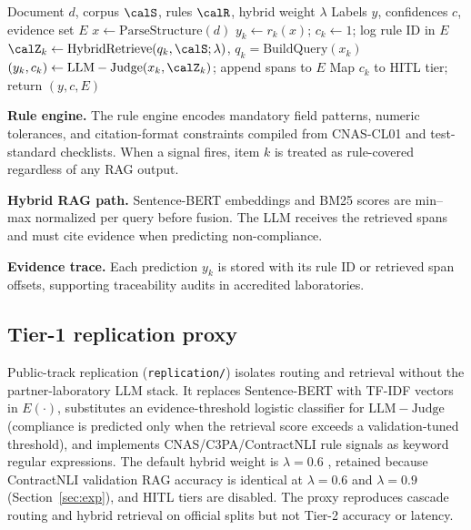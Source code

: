 \begin{algorithm}[t]
\caption{\HRAG{}-DocAudit inference (Tier-2 deployment)}
\label{alg:hrag}
\small
\begin{algorithmic}[1]
\REQUIRE Document $d$, corpus $\calS$, rules $\calR$, hybrid weight $\lambda$
\ENSURE Labels $y$, confidences $c$, evidence set $E$
\STATE $x \leftarrow \mathrm{ParseStructure}(d)$
    \STATE $y_k \leftarrow r_k(x)$; $c_k \leftarrow 1$; log rule ID in $E$
  \ELSE
    \STATE $\calZ_k \leftarrow \mathrm{HybridRetrieve}(q_k,\calS;\lambda)$, $q_k{=}\mathrm{BuildQuery}(x_k)$
    \STATE $(y_k,c_k) \leftarrow \mathrm{LLM-Judge}(x_k,\calZ_k)$; append spans to $E$
  \ENDIF
\ENDFOR
\STATE Map $c_k$ to HITL tier; return $(y,c,E)$
\end{algorithmic}
\end{algorithm}

\textbf{Rule engine.} The rule engine encodes mandatory field patterns, numeric tolerances, and citation-format constraints compiled from CNAS-CL01 and test-standard checklists. When a signal fires, item $k$ is treated as rule-covered regardless of any RAG output.

\textbf{Hybrid RAG path.} Sentence-BERT embeddings \cite{reimers2019sentencebert} and BM25 scores are min--max normalized per query before fusion. The LLM receives the retrieved spans and must cite evidence when predicting non-compliance.

\textbf{Evidence trace.} Each prediction $y_k$ is stored with its rule ID or retrieved span offsets, supporting traceability audits in accredited laboratories.

\subsection{Tier-1 replication proxy}
\label{subsec:tier1}

Public-track replication (\texttt{replication/}) isolates routing and retrieval without the partner-laboratory LLM stack. It replaces Sentence-BERT with TF-IDF vectors in $E(\cdot)$, substitutes an evidence-threshold logistic classifier for $\mathrm{LLM-Judge}$ (compliance is predicted only when the retrieval score exceeds a validation-tuned threshold), and implements CNAS/C3PA/ContractNLI rule signals as keyword regular expressions. The default hybrid weight is $\lambda=0.6$ \cite{robertson2009bm25,karpukhin2020dpr}, retained because ContractNLI validation RAG accuracy is identical at $\lambda=0.6$ and $\lambda=0.9$ (Section~\ref{sec:exp}), and HITL tiers are disabled. The proxy reproduces cascade routing and hybrid retrieval on official splits but not Tier-2 accuracy or latency.

